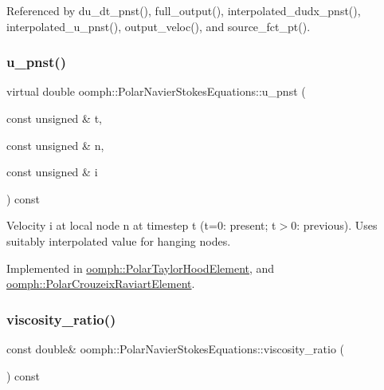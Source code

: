 Referenced by du\+\_\+dt\+\_\+pnst(), full\+\_\+output(), interpolated\+\_\+dudx\+\_\+pnst(), interpolated\+\_\+u\+\_\+pnst(), output\+\_\+veloc(), and source\+\_\+fct\+\_\+pt().

\mbox{\label{classoomph_1_1PolarNavierStokesEquations_ace9bb9807c722cd910ed54891df7d58c}} 
\subsubsection{\texorpdfstring{u\+\_\+pnst()}{u\_pnst()}\hspace{0.1cm}{\footnotesize\ttfamily [2/2]}}
{\footnotesize\ttfamily virtual double oomph\+::\+Polar\+Navier\+Stokes\+Equations\+::u\+\_\+pnst (\begin{DoxyParamCaption}\item[{const unsigned \&}]{t,  }\item[{const unsigned \&}]{n,  }\item[{const unsigned \&}]{i }\end{DoxyParamCaption}) const\hspace{0.3cm}{\ttfamily [pure virtual]}}



Velocity i at local node n at timestep t (t=0\+: present; t$>$0\+: previous). Uses suitably interpolated value for hanging nodes. 



Implemented in \hyperlink{classoomph_1_1PolarTaylorHoodElement_ad1faa74e287808e3a2ebc493d6e78686}{oomph\+::\+Polar\+Taylor\+Hood\+Element}, and \hyperlink{classoomph_1_1PolarCrouzeixRaviartElement_a0c61f886e4869b04ef14e4f160812985}{oomph\+::\+Polar\+Crouzeix\+Raviart\+Element}.

\mbox{\label{classoomph_1_1PolarNavierStokesEquations_a3a7facdf213898283bd83269abb0d9bb}} 
\subsubsection{\texorpdfstring{viscosity\+\_\+ratio()}{viscosity\_ratio()}}
{\footnotesize\ttfamily const double\& oomph\+::\+Polar\+Navier\+Stokes\+Equations\+::viscosity\+\_\+ratio (\begin{DoxyParamCaption}{ }\end{DoxyParamCaption}) const\hspace{0.3cm}{\ttfamily [inline]}}




